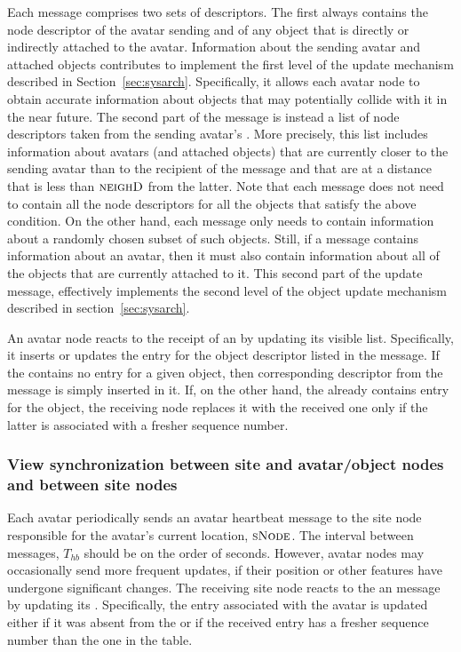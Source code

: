 Each \avupda message comprises two sets of descriptors. The first
always contains the node descriptor of the avatar sending and of any
object that is directly or indirectly attached to the
avatar. Information about the sending avatar and attached objects
contributes to implement the first level of the update mechanism
described in Section~\ref{sec:sysarch}. Specifically, it allows each
avatar node to obtain accurate information about objects that may
potentially collide with it in the near future. The second part of the
\avupda message is instead a list of node descriptors taken from the
sending avatar's \vlist. More precisely, this list includes
information about avatars (and attached objects) that are currently
closer to the sending avatar than to the recipient of the message and
that are at a distance that is less than $\textsc{neighD}$ from the
latter. Note that each \avupda message does not need to contain all
the node descriptors for all the objects that satisfy the above
condition. On the other hand, each message only needs to contain
information about a randomly chosen subset of such objects.   Still, if a message contains information about an avatar,
then it must also contain information about all of the objects that
are currently attached to it. This second part of the update message,
effectively implements the second level of the object update mechanism
described in section~\ref{sec:sysarch}. 

An avatar node reacts to the receipt of an \avupda by updating its
visible list. Specifically, it inserts or updates the entry for the
object descriptor listed in the message. If the \vlist contains no
entry for a given object, then corresponding descriptor from the
message is simply inserted in it. If, on the other hand, the \vlist
already contains entry for the object, the receiving node replaces it
with the received one only if the latter is associated with a fresher
sequence number.



\subsubsection{View synchronization between site and avatar/object nodes and
  between site nodes}
\msgentry{\avhb}
\desc

Each avatar periodically sends an avatar heartbeat message to the site
node responsible for the avatar's current location, $\textsc{sNode}$. The
interval between messages, $T_{hb}$ should be on the order of
seconds. However, avatar nodes may occasionally send more frequent
updates, if their position or other features have undergone
significant changes. The receiving site node reacts to the an \avhb
message by updating its \vlist. Specifically, the entry associated
with the avatar is updated either if it was absent from the \vlist or
if the received entry has a fresher sequence number than the one in
the table.


